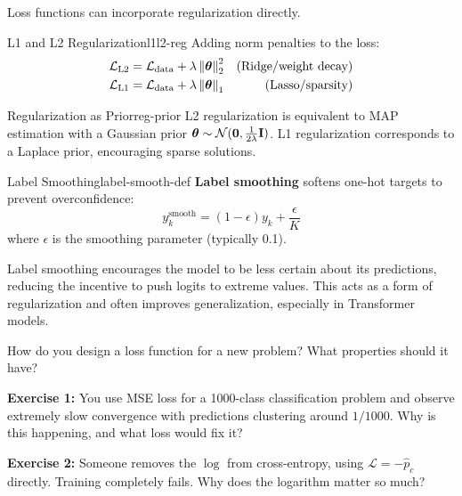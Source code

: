 \documentclass[../../main.tex]{subfiles}
\begin{document}
Loss functions can incorporate regularization directly.

\begin{definition}{L1 and L2 Regularization}{l1l2-reg}
Adding norm penalties to the loss:
\begin{align}
    \mathcal{L}_{\text{L2}} &= \mathcal{L}_{\text{data}} + \lambda \left\lVert \boldsymbol{\theta} \right\rVert_2^2 & \text{(Ridge/weight decay)} \\
    \mathcal{L}_{\text{L1}} &= \mathcal{L}_{\text{data}} + \lambda \left\lVert \boldsymbol{\theta} \right\rVert_1 & \text{(Lasso/sparsity)}
\end{align}
\end{definition}

\begin{theorem}{Regularization as Prior}{reg-prior}
L2 regularization is equivalent to MAP estimation with a Gaussian prior $\boldsymbol{\theta} \sim \mathcal{N}(\mathbf{0}, \frac{1}{2\lambda}\mathbf{I})$. L1 regularization corresponds to a Laplace prior, encouraging sparse solutions.
\end{theorem}

\begin{definition}{Label Smoothing}{label-smooth-def}
\textbf{Label smoothing} softens one-hot targets to prevent overconfidence:
\[
    y_k^{\text{smooth}} = (1 - \epsilon) y_k + \frac{\epsilon}{K}
\]
where $\epsilon$ is the smoothing parameter (typically 0.1).
\end{definition}

\begin{intuition}
Label smoothing encourages the model to be less certain about its predictions, reducing the incentive to push logits to extreme values. This acts as a form of regularization and often improves generalization, especially in Transformer models.
\end{intuition}

\begin{checkpoint}
How do you design a loss function for a new problem? What properties should it have?
\end{checkpoint}

\begin{whatbreaks}
\textbf{Exercise 1:} You use MSE loss for a 1000-class classification problem and observe extremely slow convergence with predictions clustering around $1/1000$. Why is this happening, and what loss would fix it?

\textbf{Exercise 2:} Someone removes the $\log$ from cross-entropy, using $\mathcal{L} = -\hat{p}_c$ directly. Training completely fails. Why does the logarithm matter so much?
\end{whatbreaks}
\end{document}
